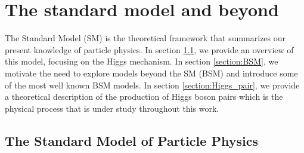 
\chapter{The standard model and beyond}
\label{chapter:SM}

The Standard Model (SM) is the theoretical framework that summarizes our present knowledge of particle physics. In section \ref{section:overview_SM}, we provide an overview of this model, focusing on the Higgs mechanism. In section \ref{section:BSM}, we motivate the need to explore models beyond the SM (BSM) and introduce some of the most well known BSM models. In section \ref{section:Higgs_pair}, we provide a theoretical description of the production of Higgs boson pairs which is the physical process that is under study throughout this work.


\section{The Standard Model of Particle Physics}
\label{section:overview_SM}

